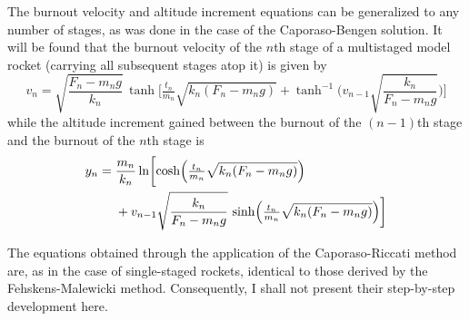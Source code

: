 The burnout velocity and altitude increment equations can be generalized to any number of stages,
as was done in the case of the Caporaso-Bengen solution. It will be found that the burnout velocity
of the $n$th stage of a multistaged model rocket (carrying all subsequent stages atop it) is given
by
\begin{equation}\label{ch4:eq:59}
v_n = \sqrt{\frac{F_n - m_ng}{k_n}}\,\tanh\biggl[\tfrac{t_n}{m_n}\sqrt{k_n(F_n - m_ng)}
  + \tanh^{-1}\biggl(v_{n-1}\sqrt{\frac{k_n}{F_n - m_ng}}\biggr)\biggr]
\end{equation}
while the altitude increment gained between the burnout of the $(n-1)$th stage and the burnout of
the $n$th stage is
\begin{equation}\label{ch4:eq:60}
\begin{split}
y_n = {}&\frac{m_n}{k_n}\ln\biggl[\cosh\Bigl(\tfrac{t_n}{m_n}\sqrt{k_n(F_n - m_ng)}\Bigr)\\
&+ v_{n-1}\sqrt{\frac{k_n}{F_n - m_ng}}\,\sinh\Bigl(\tfrac{t_n}{m_n}\sqrt{k_n(F_n - m_ng)}\Bigr)
  \biggr]
\end{split}
\end{equation}

The equations obtained through the application of the Caporaso-Riccati method are, as in the case
of single-staged rockets, identical to those derived by the Fehskens-Malewicki method. Consequently,
I shall not present their step-by-step development here.

